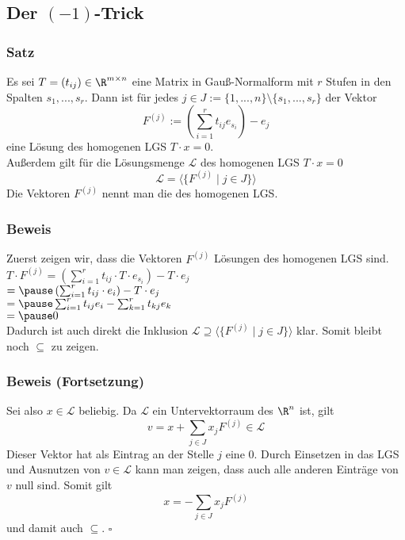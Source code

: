 \subsection{Der $(-1)$-Trick}
\makeSectionDividerPage
%
%
\begin{frame}\frametitle{Satz}
Es sei $T =(t_{ij}) \in \R^{m\times n}$ eine Matrix in Gauß-Normalform mit $r$ Stufen in den Spalten $s_1,...,s_r$. Dann ist für jedes $j \in J:=\{1,...,n\}\setminus\{s_1,...,s_r\}$ der Vektor
$$
F^{(j)}:=\left(\sum_{i=1}^r t_{ij} e_{s_i} \right) - e_j
$$
eine Lösung des homogenen LGS $T\cdot x = 0$.\\
Außerdem gilt für die Lösungsmenge $\mathcal L$ des homogenen LGS $T\cdot x=0$
$$
\mathcal{L}=\langle \{F^{(j)} \mid j \in J\} \rangle
$$
\pause
\vfill
Die Vektoren $F^{(j)}$ nennt man die  des homogenen LGS.
\end{frame}
%
%
\begin{frame}\frametitle{Beweis}
Zuerst zeigen wir, dass die Vektoren $F^{(j)}$ Lösungen des homogenen LGS sind. \\\vspace{2mm}\pause
$
T\cdot F^{(j)}=\left(\sum_{i=1}^r t_{ij}\cdot T \cdot e_{s_i} \right) - T\cdot e_j $\\
\hspace{13.25mm}$= \pause \left(\sum_{i=1}^r t_{ij}\cdot e_i \right) - T\cdot e_j$\\
\hspace{13.25mm}$= \pause \sum_{i=1}^r t_{ij} e_i  - \sum_{k=1}^r t_{kj} e_k$\\
\hspace{13.25mm}$= \pause 0
$\\ \vspace{2mm}
Dadurch ist auch direkt die Inklusion $\mathcal{L} \supseteq \langle \{F^{(j)} \mid j \in J\} \rangle$ klar. Somit bleibt noch $\subseteq$ zu zeigen. 
\end{frame}
%
%
\begin{frame}\frametitle{Beweis (Fortsetzung)}
Sei also $x \in \mathcal L$ beliebig. Da $\mathcal L$ ein Untervektorraum des $\R^n$ ist, gilt
$$
v=x + \sum_{j\in J} x_j F^{(j)} \in \mathcal L
$$
Dieser Vektor hat als Eintrag an der Stelle $j$ eine $0$. Durch Einsetzen in das LGS und Ausnutzen von $v \in \mathcal L$ kann man zeigen, dass auch alle anderen Einträge von $v$ null sind. Somit gilt 
$$
x= -\sum_{j\in J} x_j F^{(j)} 
$$
und damit auch $\subseteq$. \hfill $\square$
\end{frame}
%
%
